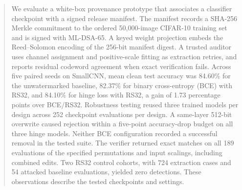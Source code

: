 \begin{abstract}
We evaluate a white-box provenance prototype that associates a classifier checkpoint with a signed release manifest. The manifest records a SHA-256 Merkle commitment to the ordered 50,000-image CIFAR-10 training set and is signed with ML-DSA-65. A keyed weight projection embeds the Reed--Solomon encoding of the 256-bit manifest digest. A trusted auditor uses channel assignment and positive-scale fitting as extraction retries, and reports residual codeword agreement when exact verification fails. Across five paired seeds on SmallCNN, mean clean test accuracy was 84.60\% for the unwatermarked baseline, 82.37\% for binary cross-entropy (BCE) with RS32, and 84.10\% for hinge loss with RS32, a gain of 1.73 percentage points over BCE/RS32. Robustness testing reused three trained models per design across 252 checkpoint evaluations per design. A same-layer 512-bit overwrite caused rejection within a five-point accuracy-drop budget on all three hinge models. Neither BCE configuration recorded a successful removal in the tested suite. The verifier returned exact matches on all 189 evaluations of the specified permutations and input scalings, including combined edits. Two RS32 control cohorts, with 724 extraction cases and 54 attacked baseline evaluations, yielded zero detections. These observations describe the tested checkpoints and settings.
\end{abstract}
